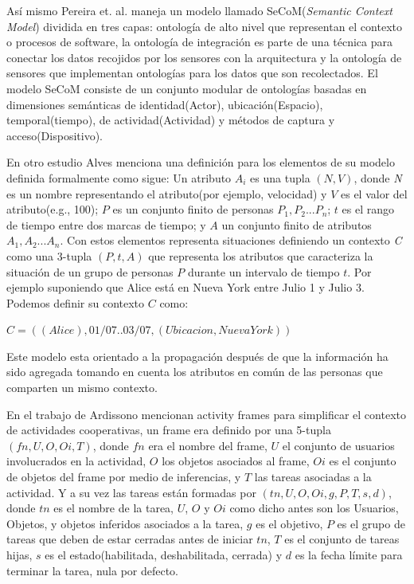 As\'i mismo Pereira et. al. \cite{pereira2013CSCWD} maneja un modelo llamado SeCoM(\textit{Semantic Context Model}) dividida en tres capas: ontolog\'ia de alto nivel que representan el contexto o procesos de software, la  ontolog\'ia de integraci\'on es parte de una t\'ecnica para conectar los datos recojidos por los sensores con la arquitectura y la ontolog\'ia de sensores que implementan ontolog\'ias para los datos que son recolectados. El modelo SeCoM consiste de un conjunto modular de ontolog\'ias basadas en dimensiones sem\'anticas de identidad(Actor), ubicaci\'on(Espacio), temporal(tiempo), de actividad(Actividad) y m\'etodos de captura y acceso(Dispositivo).

En otro estudio Alves \cite{alves2013radiator} menciona una definici\'on para los elementos de su modelo definida formalmente como sigue: Un atributo $A_{i}$ es una tupla $( N, V )$, donde \textit{N} es un nombre representando el atributo(por ejemplo, velocidad) y $V$ es el valor del atributo(e.g., 100); $P$ es un conjunto finito de personas ${P_{1},P_{2}...P_{n}}$; $t$ es el rango de tiempo entre dos marcas de tiempo; y $\textit{A}$ un conjunto finito de atributos ${A_{1},A_{2}...A_{n}}$. Con estos elementos representa situaciones definiendo un contexto \textit{C} como una 3-tupla $( P, t, A )$ que representa los atributos que caracteriza la situaci\'on de un grupo de personas $P$ durante un intervalo de tiempo $t$. Por ejemplo suponiendo que Alice est\'a en Nueva York entre Julio 1 y Julio 3. Podemos definir su contexto $C$ como:

$C=( ( Alice ), 01/07..03/07, ( Ubicacion, Nueva York ))$

Este modelo esta orientado a la propagaci\'on despu\'es de que la informaci\'on ha sido agregada tomando en cuenta los atributos en com\'un de las personas que comparten un mismo contexto.

En el trabajo de Ardissono \cite{ardissono2012context} mencionan activity frames para simplificar el contexto de actividades cooperativas, un frame era definido por una 5-tupla $( fn, U, O, Oi, T )$, donde $fn$ era el nombre del frame, $U$ el conjunto de usuarios involucrados en la actividad, $O$ los objetos asociados al frame, $Oi$ es el conjunto de objetos del frame por medio de inferencias, y $T$ las tareas asociadas a la actividad. Y a su vez las tareas est\'an formadas por $( tn, U, O, Oi, g, P, T, s, d )$, donde $tn$ es el nombre de la tarea, $U$, $O$ y $Oi$ como dicho antes son los Usuarios, Objetos, y objetos inferidos asociados a la tarea, $g$ es el objetivo, $P$ es el grupo de tareas que deben de estar cerradas antes de iniciar $tn$, $T$ es el conjunto de tareas hijas, $s$ es el estado(habilitada, deshabilitada, cerrada) y $d$ es la fecha l\'imite para terminar la tarea, nula por defecto.

